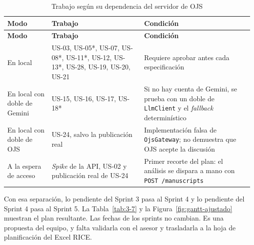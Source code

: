 {\small
\begin{longtable}{@{}>{\raggedright\arraybackslash}p{}>{\raggedright\arraybackslash}p{}>{\raggedright\arraybackslash}p{}@{}}
\caption{Trabajo según su dependencia del servidor de OJS}\label{tab:3-6}\\
\toprule
\textbf{Modo} & \textbf{Trabajo} & \textbf{Condición} \\
\midrule
\endfirsthead
\toprule
\textbf{Modo} & \textbf{Trabajo} & \textbf{Condición} \\
\midrule
\endhead
\bottomrule
\endfoot
\endlastfoot
En local & US-03, US-05*, US-07, US-08*, US-11*, US-12, US-13*, US-28, US-19, US-20, US-21 & Requiere aprobar antes cada especificación \\
En local con doble de Gemini & US-15, US-16, US-17, US-18* & Si no hay cuenta de Gemini, se prueba con un doble de \texttt{LlmClient} y el \emph{fallback} determinístico \\
En local con doble de OJS & US-24, salvo la publicación real & Implementación falsa de \texttt{OjsGateway}; no demuestra que OJS acepte la discusión \\
A la espera de acceso & \emph{Spike} de la API, US-02 y publicación real de US-24 & Primer recorte del plan: el análisis se dispara a mano con \texttt{POST /\allowbreak{}manuscripts} \\
\end{longtable}
}

Con esa separación, lo pendiente del Sprint 3 pasa al Sprint 4 y lo pendiente del Sprint 4 pasa al Sprint 5. La Tabla~\ref{tab:3-7} y la Figura~\ref{fig:gantt-ajustado} muestran el plan resultante. Las fechas de los sprints no cambian. Es una propuesta del equipo, y falta validarla con el asesor y trasladarla a la hoja de planificación del Excel RICE.

